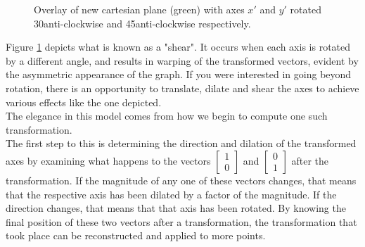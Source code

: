 \documentclass[12pt, a4paper]{article}
\begin{document}
\begin{figure}[H]
    \caption{ Overlay of new cartesian plane (green) with axes $x'$ and $y'$
        rotated 30\textdegree\space anti-clockwise and 45\textdegree\space anti-clockwise respectively. }
    \label{2d_axis_shear}
\end{figure}

Figure \ref{2d_axis_shear} depicts what is known as a "shear". It occurs when
each axis is rotated by a different angle, and results in warping of the
transformed vectors, evident by the asymmetric appearance of the graph. If you
were interested in going beyond rotation, there is an opportunity to translate,
dilate and shear the axes to achieve various effects like the one depicted.\\

The elegance in this model comes from how we begin to compute one such
transformation. \\

The first step to this is determining the direction and dilation of the
transformed axes by examining what happens to the vectors $\begin{bmatrix} 1 \\
0 \end{bmatrix}$ and $\begin{bmatrix} 0 \\
1 \end{bmatrix}$ after the transformation. If the magnitude of any one of these
vectors changes, that means that the respective axis has been dilated by a
factor of the magnitude. If the direction changes, that means that that axis has
been rotated. By knowing the final position of these two vectors after a
transformation, the transformation that took place can be reconstructed and
applied to more points. \\    
\end{document}

